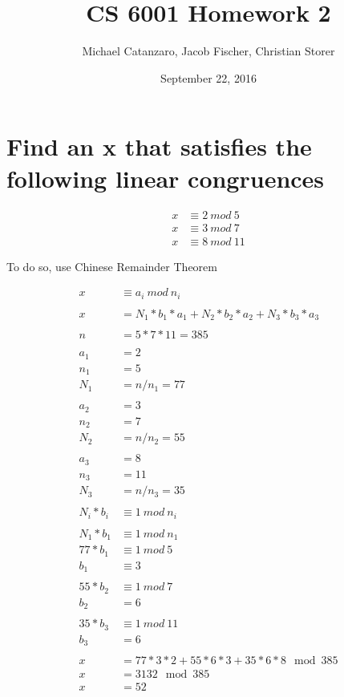 \documentclass[letterpaper]{article}
\title{CS 6001 Homework 2}
\author{Michael Catanzaro, Jacob Fischer, Christian Storer}
\date{September 22, 2016}
\begin{document}
\maketitle

\section{Find an x that satisfies the following linear congruences}

\begin{equation*}
  \begin{split}
    x &\equiv 2\ mod\ 5 \\
	  x &\equiv 3\ mod\ 7 \\
    x &\equiv 8\ mod\ 11
  \end{split}
\end{equation*}

To do so, use Chinese Remainder Theorem


\begin{equation*}
  \begin{split}
    x &\equiv a_i\ mod\ n_i \\
    \\
    x &= N_1*b_1*a_1 + N_2*b_2*a_2 + N_3*b_3*a_3 \\
    \\
    n &= 5 * 7 * 11 = 385 \\
    \\
    a_1 &= 2 \\
    n_1 &= 5 \\
    N_1 &= n/n_1 = 77 \\
    \\
    a_2 &= 3 \\
    n_2 &= 7 \\ 
    N_2 &= n/n_2 = 55 \\
    \\
    a_3 &= 8 \\
    n_3 &= 11 \\
    N_3 &= n/n_3 = 35 \\
    \\
    N_i*b_i &\equiv 1\ mod\ n_i \\
    \\
    N_1*b_1 &\equiv 1\ mod\ n_1 \\
    77*b_1 &\equiv 1\ mod\ 5 \\
    b_1 &\equiv 3 \\
    \\
    55*b_2 &\equiv 1\ mod\ 7 \\
    b_2 &= 6 \\
    \\
    35*b_3 &\equiv 1\ mod\ 11 \\
    b_3 &= 6 \\
    \\
    x &= 77*3*2 + 55*6*3 + 35*6*8 \mod 385\\
    x &= 3132 \mod 385\\
    x &= 52
  \end{split}
\end{equation*}
\end{document}
